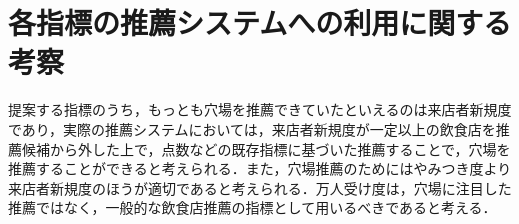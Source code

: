 \section{各指標の推薦システムへの利用に関する考察}
提案する指標のうち，もっとも穴場を推薦できていたといえるのは来店者新規度であり，実際の推薦システムにおいては，来店者新規度が一定以上の飲食店を推薦候補から外した上で，点数などの既存指標に基づいた推薦することで，穴場を推薦することができると考えられる．また，穴場推薦のためにはやみつき度より来店者新規度のほうが適切であると考えられる．万人受け度は，穴場に注目した推薦ではなく，一般的な飲食店推薦の指標として用いるべきであると考える．
